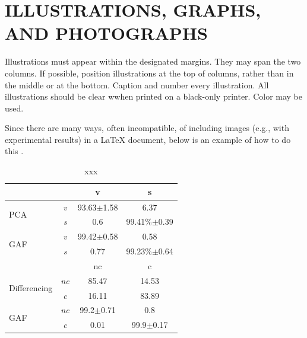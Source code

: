 \documentclass{article}
\begin{document}
\section{ILLUSTRATIONS, GRAPHS, AND PHOTOGRAPHS}
\label{sec:illust}

Illustrations must appear within the designated margins.  They may span the two
columns.  If possible, position illustrations at the top of columns, rather
than in the middle or at the bottom.  Caption and number every illustration.
All illustrations should be clear wwhen printed on a black-only printer. Color
may be used.

Since there are many ways, often incompatible, of including images (e.g., with
experimental results) in a LaTeX document, below is an example of how to do
this \cite{Lamp86}.

\begin{table}
\begin{tabular}{ |l|c c c| }
\hline
& & v & s\\
\hline
\multirow{2}{*}{PCA} & \emph{v} & 93.63$\pm$1.58&6.37\\
& \emph{s}& 0.6& 99.41\%$\pm$0.39\\
\hline
\multirow{2}{*}{GAF} & \emph{v} & 99.42$\pm$0.58&0.58\\
& \emph{s}& 0.77& 99.23\%$\pm$0.64\\
\hline
\hline
& & nc & c\\
\hline
\multirow{2}{*}{Differencing} & \emph{nc} & 85.47 & 14.53\\
& \emph{c}& 16.11 & 83.89\\
\multirow{2}{*}{GAF} & \emph{nc} & 99.2$\pm$0.71 & 0.8\\
& \emph{c}& 0.01 & 99.9$\pm$0.17\\
\hline
\end{tabular}
\caption{xxx}
\label{tab:cm}
\end{table}
\end{document}
